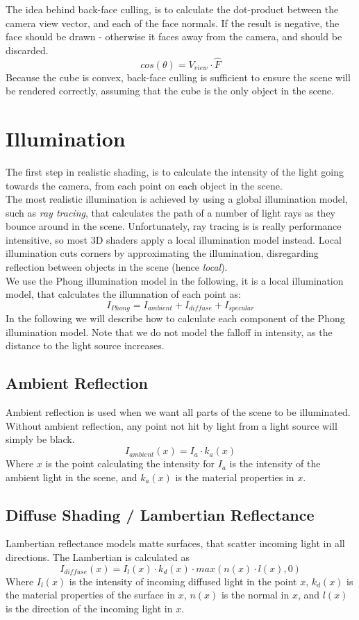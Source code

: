 \documentclass[a4paper,11pt]{article}
\begin{document}
The idea behind back-face culling, is to calculate the dot-product between the camera view vector, and each of the face normals. If the result is negative, the face should be drawn - otherwise it faces away from the camera, and should be discarded.
\[cos(\theta) = V_{view} \cdot \hat{F}\]
Because the cube is convex, back-face culling is sufficient to ensure the scene will be rendered correctly, assuming that the cube is the only object in the scene.

\section{Illumination}
The first step in realistic shading, is to calculate the intensity of the light going towards the camera, from each point on each object in the scene.\\

The most realistic illumination is achieved by using a global illumination model, such as \emph{ray tracing}, that calculates the path of a number of light rays as they bounce around in the scene. Unfortunately, ray tracing is is really performance intensitive, so most 3D shaders apply a local illumination model instead. Local illumination cuts corners by approximating the illumination, disregarding reflection between objects in the scene (hence \emph{local}).\\

We use the Phong illumination model in the following, it is a local illumination model, that calculates the illumnation of each point as:
\[I_{Phong} = I_{ambient} + I_{diffuse} + I_{specular}\]
In the following we will describe how to calculate each component of the Phong illumination model. Note that we do not model the falloff in intensity, as the distance to the light source increases.
\subsection{Ambient Reflection}
Ambient reflection is used when we want all parts of the scene to be illuminated. Without ambient reflection, any point not hit by light from a light source will simply be black.
\[I_{ambient}(x) = I_a \cdot k_a(x)\]
Where $x$ is the point calculating the intensity for $I_a$ is the intensity of the ambient light in the scene, and $k_a(x)$ is the material properties in $x$.

\subsection{Diffuse Shading / Lambertian Reflectance}
Lambertian reflectance models matte surfaces, that scatter incoming light in all directions.
The Lambertian is calculated as
\[I_{diffuse}(x)=I_l(x) \cdot k_d(x) \cdot max(n(x) \cdot l(x), 0)\]
Where $I_l(x)$ is the intensity of incoming diffused light in the point $x$, $k_d(x)$ is the material properties of the surface in $x$, $n(x)$ is the normal in $x$, and $l(x)$ is the direction of the incoming light in $x$.
\end{document}
